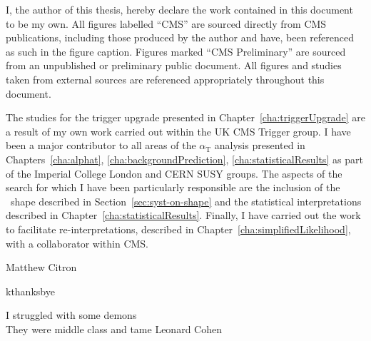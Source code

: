 \begin{declaration}
I, the author of this thesis, hereby declare the work contained in this 
document to be my own. All figures labelled ``CMS'' are sourced directly from CMS publications, 
including those produced by the author and have, been referenced as such 
in the figure caption. Figures marked ``CMS Preliminary'' are sourced from an unpublished 
or preliminary public document. All figures and studies taken from external sources are referenced appropriately 
throughout this document.

The studies for the trigger upgrade presented in Chapter~\ref{cha:triggerUpgrade} are 
a result of my own work carried out within the UK CMS Trigger group. I have
been a major contributor to all areas of the $\alpha_\text{T}$ 
analysis presented in Chapters~\ref{cha:alphat}, \ref{cha:backgroundPrediction}, 
\ref{cha:statisticalResults} as part of the Imperial College London and CERN SUSY groups.
The aspects of the search for which I have been particularly responsible are 
the inclusion of the \mht~shape described in Section~\ref{sec:syst-on-shape} 
and the statistical interpretations described in Chapter~\ref{cha:statisticalResults}.
Finally, I have carried out the work to facilitate re-interpretations, described in 
Chapter~\ref{cha:simplifiedLikelihood}, with a collaborator within CMS.
  \begin{flushright}
    Matthew Citron
  \end{flushright}
\end{declaration}


\begin{acknowledgements}
kthanksbye
\end{acknowledgements}



\tableofcontents

\listoffigures
\listoftables
\frontquote%
  {I struggled with some demons\\ They were middle class and tame}
  {Leonard Cohen}
